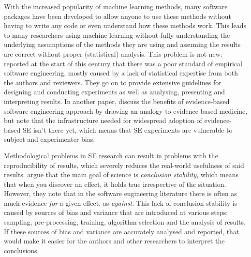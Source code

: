 \documentclass[a4paper]{article}
\begin{document}
With the increased popularity of machine learning methods, many software packages have been developed to allow anyone to use these methods without having to write any code or even understand how these methods work. This leads to many researchers using machine learning without fully understanding the underlying assumptions of the methods they are using and assuming the results are correct without proper (statistical) analysis. This problem is not new: \textcite{kitchenham2002} reported at the start of this century that there was a poor standard of empirical software engineering, mostly caused by a lack of statistical expertise from both the authors and reviewers. They go on to provide extensive guidelines for designing and conducting experiments as well as analysing, presenting and interpreting results. In another paper, \textcite{kitchenham2004} discuss the benefits of evidence-based software engineering approach by drawing an analogy to evidence-based medicine, but note that the infrastructure needed for widespread adoption of evidence-based SE isn't there yet, which means that SE experiments are vulnerable to subject and experimenter bias. 

Methodological problems in SE research can result in problems with the reproducibility of results, which severely reduces the real-world usefulness of said results. \textcite{Menzies2012} argue that the main goal of science is \textit{conclusion stability}, which means that when you discover an effect, it holds true irrespective of the situation. However, they note that in the software engineering literature there is often as much evidence \textit{for} a given effect, as \textit{against}. This lack of conclusion stability is caused by sources of bias and variance that are introduced at various steps: sampling, pre-processing, training, algorithm selection and the analysis of results. If these sources of bias and variance are accurately analysed and reported, that would make it easier for the authors and other researchers to interpret the conclusions.
\end{document}
